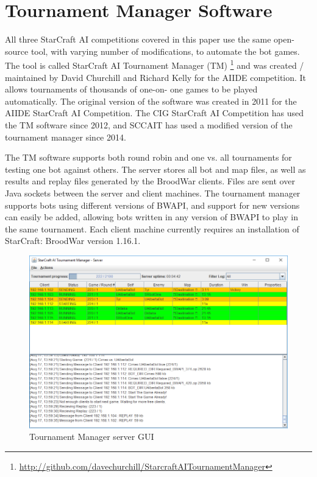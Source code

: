 \section{Tournament Manager Software}\label{secTournamentManagerSoftware}

All three StarCraft AI competitions covered in this paper use the same open-source tool, with varying number of modifications, to automate the bot games. The tool is called StarCraft AI Tournament Manager (TM) \footnote{\url{http://github.com/davechurchill/StarcraftAITournamentManager}} and was created / maintained by David Churchill and Richard Kelly for the AIIDE competition. It allows tournaments of thousands of one-on- one games to be played automatically. The original version of the software was created in 2011 for the AIIDE StarCraft AI Competition. The CIG StarCraft AI Competition has used the TM software since 2012, and SCCAIT has used a modified version of the tournament manager since 2014. 

The TM software supports both round robin and one vs. all tournaments for testing one bot against others. The server stores all bot and map files, as well as results and replay files generated by the BroodWar clients. Files are sent over Java sockets between the server and client machines. The tournament manager supports bots using different versions of BWAPI, and support for new versions can easily be added, allowing bots written in any version of BWAPI to play in the same tournament. Each client machine currently requires an installation of StarCraft: BroodWar version 1.16.1.

\begin{figure}[t]
  \centering
  \includegraphics[width=1\columnwidth]{fig/tournament-manager-screenshot.png}
  \caption{Tournament Manager server GUI}
  \label{tmServerGUI}
\end{figure}

